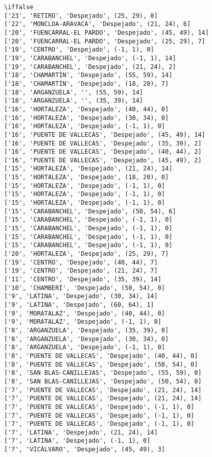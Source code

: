 \documentclass[11pt]{article}
\begin{document}
    \begin{Verbatim}[commandchars=\\\{\}]
    \iffalse
['23', 'RETIRO', 'Despejado', (25, 29), 0]
['22', 'MONCLOA-ARAVACA', 'Despejado', (21, 24), 6]
['20', 'FUENCARRAL-EL PARDO', 'Despejado', (45, 49), 14]
['20', 'FUENCARRAL-EL PARDO', 'Despejado', (25, 29), 7]
['19', 'CENTRO', 'Despejado', (-1, 1), 0]
['19', 'CARABANCHEL', 'Despejado', (-1, 1), 14]
['19', 'CARABANCHEL', 'Despejado', (21, 24), 2]
['18', 'CHAMARTÍN', 'Despejado', (55, 59), 14]
['18', 'CHAMARTÍN', 'Despejado', (18, 20), 7]
['18', 'ARGANZUELA', '', (55, 59), 14]
['18', 'ARGANZUELA', '', (35, 39), 14]
['16', 'HORTALEZA', 'Despejado', (40, 44), 0]
['16', 'HORTALEZA', 'Despejado', (30, 34), 0]
['16', 'HORTALEZA', 'Despejado', (-1, 1), 0]
['16', 'PUENTE DE VALLECAS', 'Despejado', (45, 49), 14]
['16', 'PUENTE DE VALLECAS', 'Despejado', (35, 39), 2]
['16', 'PUENTE DE VALLECAS', 'Despejado', (40, 44), 2]
['16', 'PUENTE DE VALLECAS', 'Despejado', (45, 49), 2]
['15', 'HORTALEZA', 'Despejado', (21, 24), 14]
['15', 'HORTALEZA', 'Despejado', (18, 20), 0]
['15', 'HORTALEZA', 'Despejado', (-1, 1), 0]
['15', 'HORTALEZA', 'Despejado', (-1, 1), 0]
['15', 'HORTALEZA', 'Despejado', (-1, 1), 0]
['15', 'CARABANCHEL', 'Despejado', (50, 54), 6]
['15', 'CARABANCHEL', 'Despejado', (-1, 1), 0]
['15', 'CARABANCHEL', 'Despejado', (-1, 1), 0]
['15', 'CARABANCHEL', 'Despejado', (-1, 1), 0]
['15', 'CARABANCHEL', 'Despejado', (-1, 1), 0]
['20', 'HORTALEZA', 'Despejado', (25, 29), 7]
['19', 'CENTRO', 'Despejado', (40, 44), 7]
['19', 'CENTRO', 'Despejado', (21, 24), 7]
['11', 'CENTRO', 'Despejado', (35, 39), 14]
['10', 'CHAMBERÍ', 'Despejado', (50, 54), 0]
['9', 'LATINA', 'Despejado', (30, 34), 14]
['9', 'LATINA', 'Despejado', (60, 64), 1]
['9', 'MORATALAZ', 'Despejado', (40, 44), 0]
['9', 'MORATALAZ', 'Despejado', (-1, 1), 0]
['8', 'ARGANZUELA', 'Despejado', (35, 39), 0]
['8', 'ARGANZUELA', 'Despejado', (30, 34), 0]
['8', 'ARGANZUELA', 'Despejado', (-1, 1), 0]
['8', 'PUENTE DE VALLECAS', 'Despejado', (40, 44), 0]
['8', 'PUENTE DE VALLECAS', 'Despejado', (50, 54), 0]
['8', 'SAN BLAS-CANILLEJAS', 'Despejado', (55, 59), 0]
['8', 'SAN BLAS-CANILLEJAS', 'Despejado', (50, 54), 0]
['7', 'PUENTE DE VALLECAS', 'Despejado', (21, 24), 14]
['7', 'PUENTE DE VALLECAS', 'Despejado', (21, 24), 14]
['7', 'PUENTE DE VALLECAS', 'Despejado', (-1, 1), 0]
['7', 'PUENTE DE VALLECAS', 'Despejado', (-1, 1), 0]
['7', 'PUENTE DE VALLECAS', 'Despejado', (-1, 1), 0]
['7', 'LATINA', 'Despejado', (21, 24), 14]
['7', 'LATINA', 'Despejado', (-1, 1), 0]
['7', 'VICÁLVARO', 'Despejado', (45, 49), 3]

\end{Verbatim}
\end{document}

